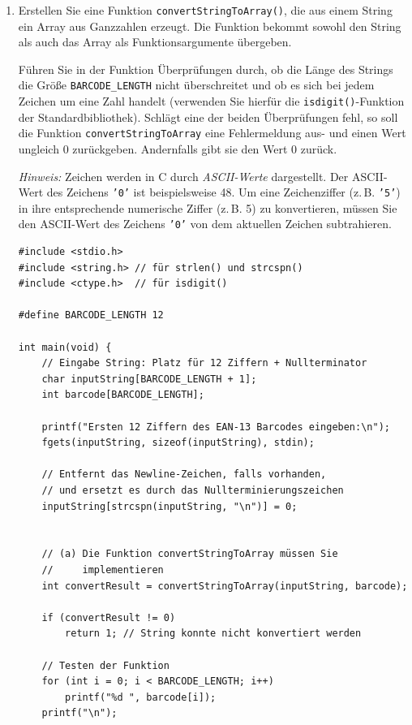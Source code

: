 \begin{enumerate}

\item Erstellen Sie eine Funktion \texttt{convertStringToArray()}, die
aus einem String ein Array aus Ganzzahlen erzeugt. Die Funktion bekommt sowohl
den String als auch das Array als Funktionsargumente übergeben.

Führen Sie in der Funktion Überprüfungen durch, ob die Länge des Strings die
Größe \texttt{BARCODE_LENGTH} nicht überschreitet und ob es sich bei
jedem Zeichen um eine Zahl handelt (verwenden Sie hierfür die
\texttt{isdigit()}-Funktion der Standardbibliothek). Schlägt eine der
beiden Überprüfungen fehl, so soll die Funktion
\texttt{convertStringToArray} eine Fehlermeldung aus- und einen Wert
ungleich 0 zurückgeben. Andernfalls gibt sie den Wert 0 zurück.

\textit{Hinweis:} Zeichen werden in C durch \textit{ASCII-Werte} dargestellt.
Der ASCII-Wert des Zeichens \texttt{'0'} ist beispielsweise 48. Um eine
Zeichenziffer (z.\,B. \texttt{'5'}) in ihre entsprechende numerische Ziffer
(z.\,B. 5) zu konvertieren, müssen Sie den ASCII-Wert des Zeichens \texttt{'0'}
von dem aktuellen Zeichen subtrahieren.

\pagebreak

\Vorlage
\begin{verbatim}
#include <stdio.h>
#include <string.h> // für strlen() und strcspn()
#include <ctype.h>  // für isdigit()

#define BARCODE_LENGTH 12

int main(void) {
    // Eingabe String: Platz für 12 Ziffern + Nullterminator
    char inputString[BARCODE_LENGTH + 1];
    int barcode[BARCODE_LENGTH];

    printf("Ersten 12 Ziffern des EAN-13 Barcodes eingeben:\n");
    fgets(inputString, sizeof(inputString), stdin);

    // Entfernt das Newline-Zeichen, falls vorhanden,
    // und ersetzt es durch das Nullterminierungszeichen
    inputString[strcspn(inputString, "\n")] = 0;


    // (a) Die Funktion convertStringToArray müssen Sie
    //     implementieren
    int convertResult = convertStringToArray(inputString, barcode);

    if (convertResult != 0)
        return 1; // String konnte nicht konvertiert werden

    // Testen der Funktion
    for (int i = 0; i < BARCODE_LENGTH; i++)
        printf("%d ", barcode[i]);
    printf("\n");


\end{verbatim}
\end{enumerate}

